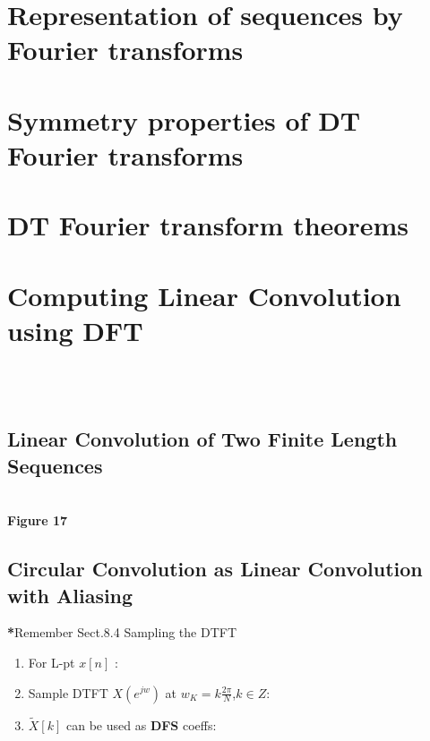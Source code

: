 \documentclass[10pt,a4paper,report]{report}       %
\begin{document}
\section{Representation of sequences by Fourier transforms}

\section{Symmetry properties of DT Fourier transforms}

\section{DT Fourier transform theorems}





\newpage


\section{Computing Linear Convolution using DFT}
\-
\vspace{2cm}\\ \-
\vspace{2cm}\\ \- 

\subsection{Linear Convolution of Two Finite Length Sequences}
\-
\vspace{2cm}\\ 
\textbf{Figure 17}


\subsection{Circular Convolution as Linear Convolution with Aliasing}
\textbf{*}Remember Sect.8.4 Sampling the DTFT

\begin{enumerate}
	\item For L-pt $x[n]$ :
	\item Sample DTFT $X(e^{jw})$ at $w_K=k\frac{2\pi}{N}$,$k \in Z$:
	\item $\widetilde{X}[k]$ can be used as \textbf{DFS} coeffs:
\end{enumerate}
\end{document}

